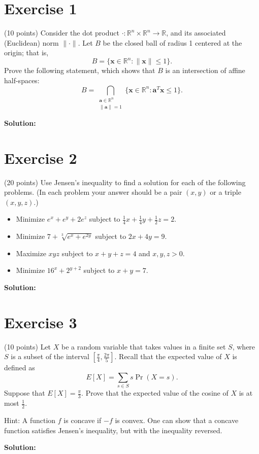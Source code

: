 \documentclass{article}
\begin{document}
\section*{Exercise 1}
(10 points) Consider the dot product $\cdot : \mathbb{R}^n \times \mathbb{R}^n \to \mathbb{R}$, and its associated (Euclidean) norm $\|\cdot\|$. Let $B$ be the closed ball of radius 1 centered at the origin; that is,
\[
    B = \{\mathbf{x} \in \mathbb{R}^n : \|\mathbf{x}\| \leq 1\}.
\]
Prove the following statement, which shows that $B$ is an intersection of affine half-spaces:
\[
    B = \bigcap_{\substack{\mathbf{a}\in\mathbb{R}^n \\ \|\mathbf{a}\|=1}} \{\mathbf{x} \in \mathbb{R}^n : \mathbf{a}^T\mathbf{x} \leq 1\}.
\]

\textbf{Solution:}

\newpage

\section*{Exercise 2}
(20 points) Use Jensen's inequality to find a solution for each of the following problems. (In each problem your answer should be a pair $(x,y)$ or a triple $(x,y,z)$.)
\begin{itemize}
\item Minimize $e^x + e^y + 2e^z$ subject to $\frac{1}{4}x + \frac{1}{4}y + \frac{1}{2}z = 2$.
\item Minimize $7 + \sqrt[3]{e^x + e^{2y}}$ subject to $2x + 4y = 9$.
\item Maximize $xyz$ subject to $x + y + z = 4$ and $x,y,z > 0$.
\item Minimize $16^x + 2^{y+2}$ subject to $x + y = 7$.
\end{itemize}

\textbf{Solution:}

\newpage

\section*{Exercise 3}
(10 points) Let $X$ be a random variable that takes values in a finite set $S$, where $S$ is a subset of the interval $[\frac{\pi}{4}, \frac{2\pi}{5}]$. Recall that the expected value of $X$ is defined as
\[
    E[X] = \sum_{s\in S} s\Pr(X = s).
\]
Suppose that $E[X] = \frac{\pi}{3}$. Prove that the expected value of the cosine of $X$ is at most $\frac{1}{2}$.

Hint: A function $f$ is concave if $-f$ is convex. One can show that a concave function satisfies Jensen's inequality, but with the inequality reversed.

\textbf{Solution:}

\newpage
\end{document}
